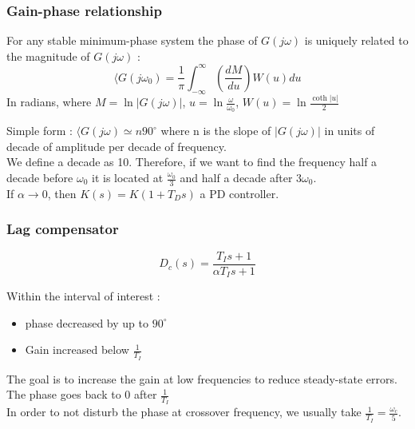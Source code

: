 \documentclass[../main.tex]{subfiles}
\begin{document}
\subsubsection{Gain-phase relationship}
\begin{theorem}
    For any stable minimum-phase system the phase of $G(j\omega)$ is uniquely related to the magnitude of $G(j\omega)$ : \begin{equation}
       \langle G(j\omega_0) = \frac{1}{\pi} \int_{-\infty}^\infty (\frac{dM}{du})W(u)du 
    \end{equation} 
    In radians, where $M = \ln\lvert G(j\omega)\rvert$, $u=\ln \frac{\omega}{\omega_0}$, $W(u) = \ln \frac{\coth\lvert u \rvert}{2}$\\
\end{theorem}

Simple form : $\langle G(j\omega) \simeq n 90^\circ$ where n is the slope of $\lvert G(j\omega)\rvert$ in units of decade of amplitude per decade of frequency.\\

We define a decade as 10. Therefore, if we want to find the frequency half a decade before $\omega_0$ it is located at $\frac{\omega_0}{3}$ and half a decade after $3\omega_0$.\\

If $\alpha\rightarrow 0$, then $K(s) = K(1+T_Ds)$ a PD controller.\\

\subsubsection{Lag compensator}
\begin{equation}
    D_c(s) = \frac{T_Is+1}{\alpha T_Is+1}
\end{equation}

Within the interval of interest : \begin{itemize}
    \item phase decreased by up to $90^\circ$\\
    \item Gain increased below $\frac{1}{T_I}$
\end{itemize}

The goal is to increase the gain at low frequencies to reduce steady-state errors. The phase goes back to 0 after $\frac{1}{T_I}$\\
In order to not disturb the phase at crossover frequency, we usually take $\frac{1}{T_I} = \frac{\omega_c}{5}$.\\
\end{document}
